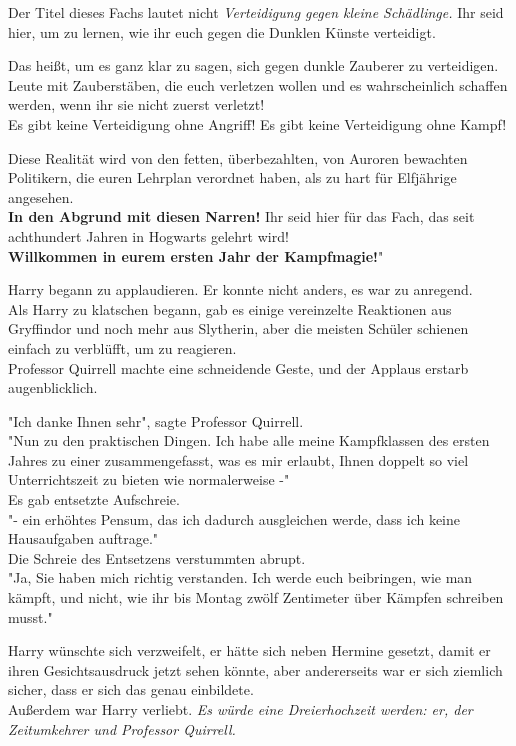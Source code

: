 {Der Titel dieses Fachs lautet nicht \emph{Verteidigung gegen kleine Schädlinge.} Ihr seid hier, um zu lernen, wie ihr euch gegen die Dunklen Künste verteidigt.

Das heißt, um es ganz klar zu sagen, sich gegen dunkle Zauberer zu verteidigen. Leute mit Zauberstäben, die euch verletzen wollen und es wahrscheinlich schaffen werden, wenn ihr sie nicht zuerst verletzt!\\

Es gibt keine Verteidigung ohne Angriff! Es gibt keine Verteidigung ohne Kampf!

Diese Realität wird von den fetten, überbezahlten, von Auroren bewachten Politikern, die euren Lehrplan verordnet haben, als zu hart für Elfjährige angesehen.\\ \textbf{In den Abgrund mit diesen Narren!} Ihr seid hier für das Fach, das seit achthundert Jahren in Hogwarts gelehrt wird!\\

\textbf{Willkommen in eurem ersten Jahr der Kampfmagie!}"

Harry begann zu applaudieren. Er konnte nicht anders, es war zu anregend.\\ Als Harry zu klatschen begann, gab es einige vereinzelte Reaktionen aus Gryffindor und noch mehr aus Slytherin, aber die meisten Schüler schienen einfach zu verblüfft, um zu reagieren.\\ Professor Quirrell machte eine schneidende Geste, und der Applaus erstarb augenblicklich.

"Ich danke Ihnen sehr", sagte Professor Quirrell.\\ "Nun zu den praktischen Dingen. Ich habe alle meine Kampfklassen des ersten Jahres zu einer zusammengefasst, was es mir erlaubt, Ihnen doppelt so viel Unterrichtszeit zu bieten wie normalerweise -"\\ Es gab entsetzte Aufschreie.\\ "- ein erhöhtes Pensum, das ich dadurch ausgleichen werde, dass ich keine Hausaufgaben auftrage."\\ Die Schreie des Entsetzens verstummten abrupt.\\ "Ja, Sie haben mich richtig verstanden. Ich werde euch beibringen, wie man kämpft, und nicht, wie ihr bis Montag zwölf Zentimeter über Kämpfen schreiben musst."

Harry wünschte sich verzweifelt, er hätte sich neben Hermine gesetzt, damit er ihren Gesichtsausdruck jetzt sehen könnte, aber andererseits war er sich ziemlich sicher, dass er sich das genau einbildete.\\ Außerdem war Harry verliebt. \emph{Es würde eine Dreierhochzeit werden: er, der Zeitumkehrer und Professor Quirrell.}

}
